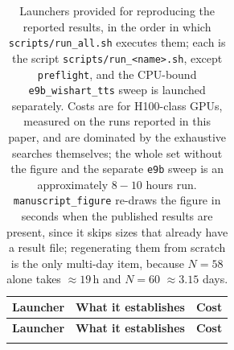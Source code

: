 \documentclass[12pt,a4paper]{elsarticle}
\begin{document}
\begin{longtable}{|p{4.2cm}|p{5.3cm}|p{2.0cm}|}
\caption{Launchers provided for reproducing the reported results, in the order in
which \texttt{scripts/run\_all.sh} executes them; each is the script
\texttt{scripts/run\_<name>.sh}, except \texttt{preflight}, and the CPU-bound
\texttt{e9b\_wishart\_tts} sweep is launched separately. Costs are for
H100-class GPUs, measured on the runs reported in this paper, and are dominated by the
exhaustive searches themselves; the whole set without the figure and the separate
\texttt{e9b} sweep is an approximately $8-10$ hours run.
\texttt{manuscript\_figure} re-draws the figure in seconds when the published
results are present, since it skips sizes that already have a result file;
regenerating them from scratch is the only multi-day item, because $N=58$ alone
takes $\approx\!19$\,h and $N=60$ $\approx\!3.15$ days.}
\label{tab:reproduction} \\

\hline
\textbf{Launcher} & \textbf{What it establishes} & \textbf{Cost} \\
\hline
\endfirsthead

\hline
\textbf{Launcher} & \textbf{What it establishes} & \textbf{Cost} \\
\hline
\endhead

\hline
\endfoot

\hline
\endlastfoot


\end{longtable}
\end{document}
